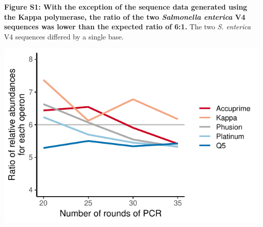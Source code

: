 \documentclass[11pt,]{article}
\begin{document}
\newpage

\textbf{Figure S1: With the exception of the sequence data generated
using the Kappa polymerase, the ratio of the two \emph{Salmonella
enterica} V4 sequences was lower than the expected ratio of 6:1.} The
two \emph{S. enterica} V4 sequences differed by a single base.

\includegraphics[width=1.0\columnwidth]{../results/figures/salmonella_bias.pdf}
\end{document}
